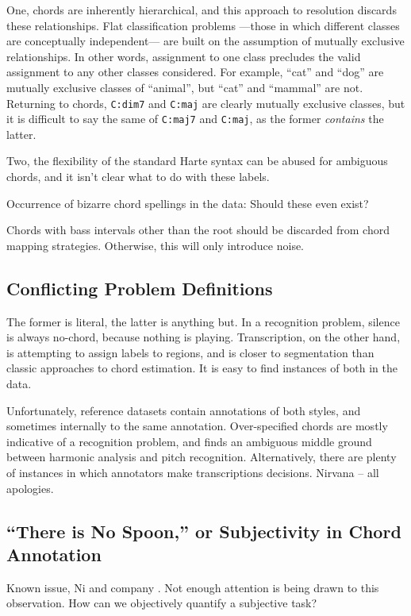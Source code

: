 \documentclass{article}
\begin{document}
One, chords are inherently hierarchical, and this approach to resolution discards these relationships.
Flat classification problems ---those in which different classes are conceptually independent--- are built on the assumption of mutually exclusive relationships.
In other words, assignment to one class precludes the valid assignment to any other classes considered.
For example, ``cat'' and ``dog'' are mutually exclusive classes of ``animal'', but ``cat'' and ``mammal'' are not.
Returning to chords, \texttt{C:dim7} and \texttt{C:maj} are clearly mutually exclusive classes, but it is difficult to say the same of \texttt{C:maj7} and \texttt{C:maj}, as the former \emph{contains} the latter.

Two, the flexibility of the standard Harte syntax can be abused for ambiguous chords, and it isn't clear what to do with these labels.

Occurrence of bizarre chord spellings in the data:
Should these even exist?



Chords with bass intervals other than the root should be discarded from chord mapping strategies.
Otherwise, this will only introduce noise.


\subsection{Conflicting Problem Definitions}

The former is literal, the latter is anything but.
In a recognition problem, silence is always no-chord, because nothing is playing.
Transcription, on the other hand, is attempting to assign labels to regions, and is closer to segmentation than classic approaches to chord estimation.
It is easy to find instances of both in the data.

Unfortunately, reference datasets contain annotations of both styles, and sometimes internally to the same annotation.
Over-specified chords are mostly indicative of a recognition problem, and finds an ambiguous middle ground between harmonic analysis and pitch recognition.
Alternatively, there are plenty of instances in which annotators make transcriptions decisions.
Nirvana -- all apologies.


\subsection{``There is No Spoon,'' or Subjectivity in Chord Annotation}

Known issue, Ni and company \cite{Ni2013Understanding}.
Not enough attention is being drawn to this observation.
How can we objectively quantify a subjective task?
\end{document}
